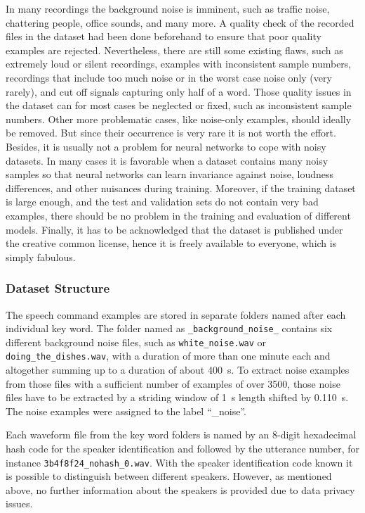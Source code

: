In many recordings the background noise is imminent, such as traffic noise, chattering people, office sounds, and many more.
A quality check of the recorded files in the dataset had been done beforehand to ensure that poor quality examples are rejected.
Nevertheless, there are still some existing flaws, such as extremely loud or silent recordings, examples with inconsistent sample numbers, recordings that include too much noise or in the worst case noise only (very rarely), and cut off signals capturing only half of a word.
Those quality issues in the dataset can for most cases be neglected or fixed, such as inconsistent sample numbers. 
Other more problematic cases, like noise-only examples, should ideally be removed.
But since their occurrence is very rare it is not worth the effort.
Besides, it is usually not a problem for neural networks to cope with noisy datasets.
In many cases it is favorable when a dataset contains many noisy samples so that neural networks can learn invariance against noise, loudness differences, and other nuisances during training.
Moreover, if the training dataset is large enough, and the test and validation sets do not contain very bad examples, there should be no problem in the training and evaluation of different models.
Finally, it has to be acknowledged that the dataset is published under the creative common license, hence it is freely available to everyone, which is simply fabulous.



\subsubsection{Dataset Structure}\label{sec:exp_dataset_structure}
The speech command examples are stored in separate folders named after each individual key word.
The folder named as \texttt{\_background\_noise\_} contains six different background noise files, such as \texttt{white\_noise.wav} or \texttt{doing\_the\_dishes.wav}, with a duration of more than one minute each and altogether summing up to a duration of about \SI{400}{s}.
To extract noise examples from those files with a sufficient number of examples of over 3500, those noise files have to be extracted by a striding window of \SI{1}{\second} length shifted by \SI{0.110}{\second}.
The noise examples were assigned to the label \enquote{\_noise}.

Each waveform file from the key word folders is named by an 8-digit hexadecimal hash code for the speaker identification and followed by the utterance number, for instance \texttt{3b4f8f24\_nohash\_0.wav}.
With the speaker identification code known it is possible to distinguish between different speakers.
However, as mentioned above, no further information about the speakers is provided due to data privacy issues.


